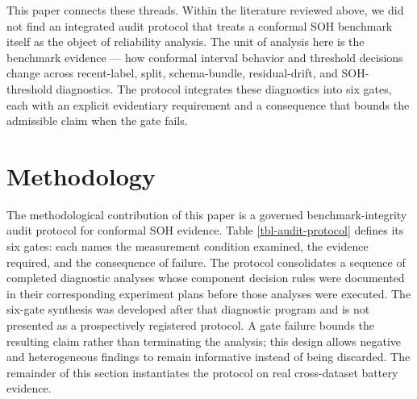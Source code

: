 \documentclass[
  number,
  preprint]{elsarticle}
\begin{document}
This paper connects these threads. Within the literature reviewed above,
we did not find an integrated audit protocol that treats a conformal SOH
benchmark itself as the object of reliability analysis. The unit of
analysis here is the benchmark evidence --- how conformal interval
behavior and threshold decisions change across recent-label, split,
schema-bundle, residual-drift, and SOH-threshold diagnostics. The
protocol integrates these diagnostics into six gates, each with an
explicit evidentiary requirement and a consequence that bounds the
admissible claim when the gate fails.

\section{Methodology}\label{sec-methodology}

The methodological contribution of this paper is a governed
benchmark-integrity audit protocol for conformal SOH evidence. Table
\ref{tbl-audit-protocol} defines its six gates: each names the
measurement condition examined, the evidence required, and the
consequence of failure. The protocol consolidates a sequence of
completed diagnostic analyses whose component decision rules were
documented in their corresponding experiment plans before those analyses
were executed. The six-gate synthesis was developed after that
diagnostic program and is not presented as a prospectively registered
protocol. A gate failure bounds the resulting claim rather than
terminating the analysis; this design allows negative and heterogeneous
findings to remain informative instead of being discarded. The remainder
of this section instantiates the protocol on real cross-dataset battery
evidence.
\end{document}

